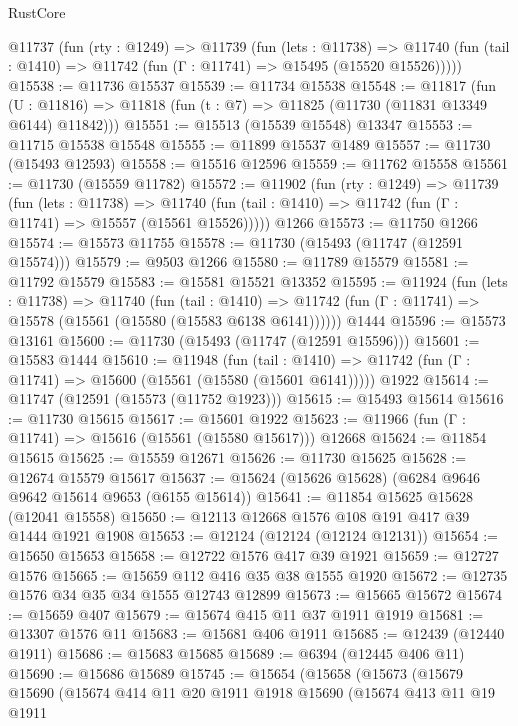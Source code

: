 \begin{lexlean}{RustCore}
\begin{coremodule}
  @11737
    (fun (rty : @1249) =>
    @11739
      (fun (lets : @11738) =>
      @11740 (fun (tail : @1410) => @11742 (fun (Γ : @11741) => @15495 (@15520 @15526)))))
@15538 := @11736 @15537
@15539 := @11734 @15538
@15548 := @11817
    (fun (U : @11816) => @11818 (fun (t : @7) => @11825 (@11730 (@11831 @13349 @6144) @11842)))
@15551 := @15513 (@15539 @15548) @13347
@15553 := @11715 @15538 @15548
@15555 := @11899 @15537 @1489
@15557 := @11730 (@15493 @12593)
@15558 := @15516 @12596
@15559 := @11762 @15558
@15561 := @11730 (@15559 @11782)
@15572 := @11902
    (fun (rty : @1249) =>
    @11739
      (fun (lets : @11738) =>
      @11740 (fun (tail : @1410) => @11742 (fun (Γ : @11741) => @15557 (@15561 @15526)))))
    @1266
@15573 := @11750 @1266
@15574 := @15573 @11755
@15578 := @11730 (@15493 (@11747 (@12591 @15574)))
@15579 := @9503 @1266
@15580 := @11789 @15579
@15581 := @11792 @15579
@15583 := @15581 @15521 @13352
@15595 := @11924
    (fun (lets : @11738) =>
    @11740
      (fun (tail : @1410) =>
      @11742 (fun (Γ : @11741) => @15578 (@15561 (@15580 (@15583 @6138 @6141))))))
    @1444
@15596 := @15573 @13161
@15600 := @11730 (@15493 (@11747 (@12591 @15596)))
@15601 := @15583 @1444
@15610 := @11948
    (fun (tail : @1410) => @11742 (fun (Γ : @11741) => @15600 (@15561 (@15580 (@15601 @6141)))))
    @1922
@15614 := @11747 (@12591 (@15573 (@11752 @1923)))
@15615 := @15493 @15614
@15616 := @11730 @15615
@15617 := @15601 @1922
@15623 := @11966 (fun (Γ : @11741) => @15616 (@15561 (@15580 @15617))) @12668
@15624 := @11854 @15615
@15625 := @15559 @12671
@15626 := @11730 @15625
@15628 := @12674 @15579 @15617
@15637 := @15624 (@15626 @15628) (@6284 @9646 @9642 @15614 @9653 (@6155 @15614))
@15641 := @11854 @15625 @15628 (@12041 @15558)
@15650 := @12113 @12668 @1576 @108 @191 @417 @39 @1444 @1921 @1908
@15653 := @12124 (@12124 (@12124 @12131))
@15654 := @15650 @15653
@15658 := @12722 @1576 @417 @39 @1921
@15659 := @12727 @1576
@15665 := @15659 @112 @416 @35 @38 @1555 @1920
@15672 := @12735 @1576 @34 @35 @34 @1555 @12743 @12899
@15673 := @15665 @15672
@15674 := @15659 @407
@15679 := @15674 @415 @11 @37 @1911 @1919
@15681 := @13307 @1576 @11
@15683 := @15681 @406 @1911
@15685 := @12439 (@12440 @1911)
@15686 := @15683 @15685
@15689 := @6394 (@12445 @406 @11)
@15690 := @15686 @15689
@15745 := @15654
    (@15658
      (@15673
        (@15679
          @15690
          (@15674
            @414
            @11
            @20
            @1911
            @1918
            @15690
            (@15674
              @413
              @11
              @19
              @1911

\end{coremodule}
\end{lexlean}
